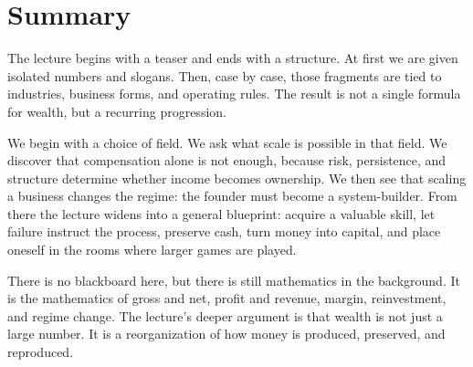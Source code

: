 \section{Summary}

The lecture begins with a teaser and ends with a structure. At first we are given isolated numbers and slogans. Then, case by case, those fragments are tied to industries, business forms, and operating rules. The result is not a single formula for wealth, but a recurring progression.

We begin with a choice of field. We ask what scale is possible in that field. We discover that compensation alone is not enough, because risk, persistence, and structure determine whether income becomes ownership. We then see that scaling a business changes the regime: the founder must become a system-builder. From there the lecture widens into a general blueprint: acquire a valuable skill, let failure instruct the process, preserve cash, turn money into capital, and place oneself in the rooms where larger games are played.

There is no blackboard here, but there is still mathematics in the background. It is the mathematics of gross and net, profit and revenue, margin, reinvestment, and regime change. The lecture's deeper argument is that wealth is not just a large number. It is a reorganization of how money is produced, preserved, and reproduced.
